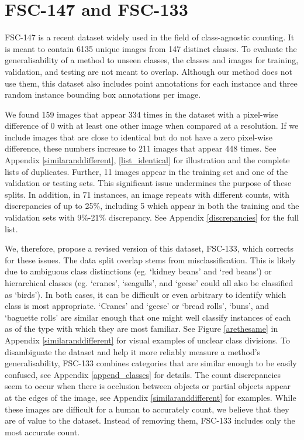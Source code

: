 \documentclass[letterpaper, 11pt]{IEEEtran}
\begin{document}
\section{FSC-147 and FSC-133}
FSC-147 \cite{ranjan2021Famnet} is a recent dataset widely used in the field of class-agnostic counting. 
It is meant to contain 6135 unique images from 147 distinct classes. To evaluate the generalisability of a method to unseen classes, the classes and images for training, validation, and testing are not meant to  overlap.
Although our method does not use them, this dataset also includes point annotations for each instance and three random instance bounding box annotations per image. 

We found 159 images that appear 334 times in the dataset with a pixel-wise difference of 0 with at least one other image when compared at a  resolution.
If we include images that are close to identical but do not have a zero pixel-wise difference, these numbers increase to 211 images that appear 448 times.
See Appendix  \ref{similaranddifferent}, \ref{list_identical} for illustration 
and the complete lists of duplicates.
Further, 11 images appear in the training set and one of the validation or testing sets.
This significant issue undermines the purpose of these splits. In addition, in 71 instances, an image repeats with different counts,  with discrepancies of up to 25\%, including 5 which appear in both the training and the validation sets with 9\%-21\% discrepancy. See Appendix  \ref{discrepancies} for the full list.

We, therefore, propose a revised version of this dataset, FSC-133, which corrects for these issues.
The data split overlap stems from misclassification. This is likely due  to ambiguous class distinctions (eg. `kidney beans' and `red beans') or hierarchical classes (eg. `cranes', `seagulls', and `geese' could all also be classified as `birds'). In both cases, it can be difficult or even arbitrary to identify which class is most appropriate. 
`Cranes' and `geese' or `bread rolls', `buns', and `baguette rolls' are similar enough that one might well classify instances of each as of the type with which they are most familiar. See Figure \ref{arethesame} in Appendix  \ref{similaranddifferent} for visual examples of unclear class divisions.
To disambiguate the dataset and help it more reliably measure a method's generalisability, FSC-133 combines categories that are similar enough to be easily confused, see Appendix  \ref{append_classes} for details.
The count discrepancies seem to occur when there is occlusion between objects or partial objects appear at the edges of the image, see Appendix  \ref{similaranddifferent} for examples. 
While these images are difficult for a human to accurately count, we believe that they are of value to the dataset. Instead of removing them, FSC-133 includes only the most accurate count.
\end{document}

